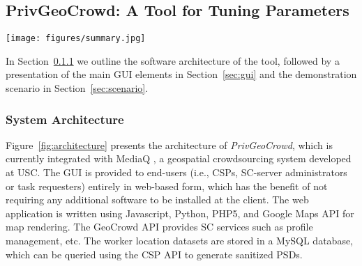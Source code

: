 \documentclass{USC-Thesis}
\newcommand{\PGC}{{\em PrivGeoCrowd}}
\numberwithin{equation}{chapter}
\begin{document}
\subsection{P\lowercase{riv}G\lowercase{eo}C\lowercase{rowd}: A Tool for Tuning Parameters}
\label{sec:software}

\begin{figure*}[!htb]\centering
  \texttt{[image: figures/summary.jpg]}
  \caption{\PGC\ main GUI integrates several component module panels}
  \label{fig:main}
\end{figure*}

In Section~\ref{sec:architecture} we outline the software architecture of the tool, followed by a presentation of the main GUI elements in Section~\ref{sec:gui} and the demonstration scenario in Section~\ref{sec:scenario}.

\subsubsection{System Architecture}
\label{sec:architecture}

Figure~\ref{fig:architecture} presents the architecture of \PGC, which is currently integrated with MediaQ \cite{kim2014mediaq}, a geospatial crowdsourcing system developed at USC. The GUI is provided to end-users (i.e., CSPs, SC-server administrators or task requesters) entirely in web-based form, which has the benefit of not requiring any additional software to be installed at the client. The web application is written using Javascript, Python, PHP5, and Google Maps API for map rendering. 
The GeoCrowd API provides SC services \cite{kim2014mediaq} such as profile management, etc. 
The worker location datasets are stored in a MySQL database, which can be queried using the CSP API to generate sanitized PSDs.


\end{document}
